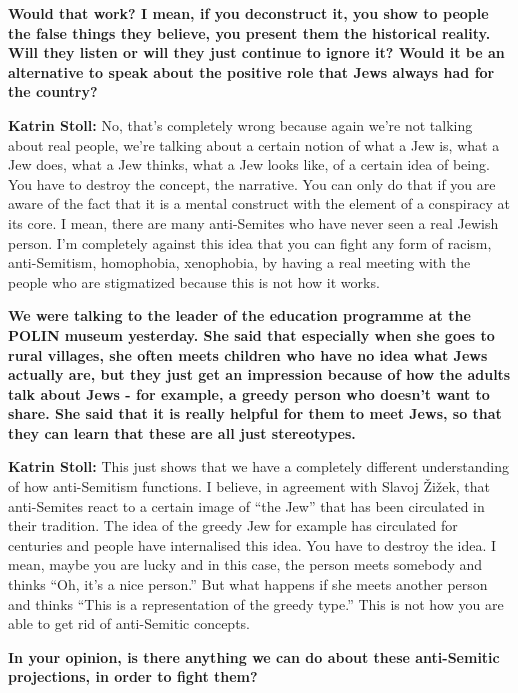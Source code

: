 \sloppy
\textbf{Would that work? I mean, if you deconstruct it, you show to people the false things they believe, you present them the historical reality. Will they listen or will they just continue to ignore it? Would it be an alternative to speak about the positive role that Jews always had for the country?} 

\textbf{Katrin Stoll:} No, that’s completely wrong because again we're not talking about real people, we're talking about a certain notion of what a Jew is, what a Jew does, what a Jew thinks, what a Jew looks like, of a certain idea of being.  You have to destroy the concept, the narrative. You can only do that if you are aware of the fact that it is a mental construct with the element of a conspiracy at its core. I mean, there are many anti-Semites who have never seen a real Jewish person. I’m completely against this idea that you can fight any form of racism, anti-Semitism, homophobia, xenophobia, by having a real meeting with the people who are stigmatized because this is not how it works. 

\textbf{We were talking to the leader of the education programme at the POLIN museum yesterday. She said that especially when she goes to rural villages, she often meets children who have no idea what Jews actually are, but they just get an impression because of how the adults talk about Jews - for example, a greedy person who doesn’t want to share. She said that it is really helpful for them to meet Jews, so that they can learn that these are all just stereotypes.} 

\textbf{Katrin Stoll:} This just shows that we have a completely different understanding of how anti-Semitism functions. I believe, in agreement with Slavoj Žižek, that anti-Semites react to a certain image of ``the Jew'' that has been circulated in their tradition. The idea of the greedy Jew for example has circulated for centuries and people have internalised this idea. You have to destroy the idea. I mean, maybe you are lucky and in this case, the person meets somebody and thinks ``Oh, it’s a nice person.'' But what happens if she meets another person and thinks ``This is a representation of the greedy type.'' This is not how you are able to get rid of anti-Semitic concepts. 

\textbf{In your opinion, is there anything we can do about these anti-Semitic projections, in order to fight them?} 


